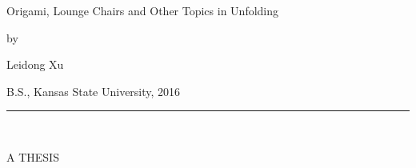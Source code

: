 \begin{center}

   \vspace{1cm}


\large Origami, Lounge Chairs and Other Topics in Unfolding\\

\vspace{0.5cm}

by\\

\vspace{0.5cm}


\large Leidong Xu\\

 \vspace{0.3cm}


   B.S., Kansas State University, 2016\\

   \vspace{0.35cm}
   \rule{2in}{0.5pt}\\
   \vspace{0.65cm}

   {\large A THESIS}\\


\end{center}
